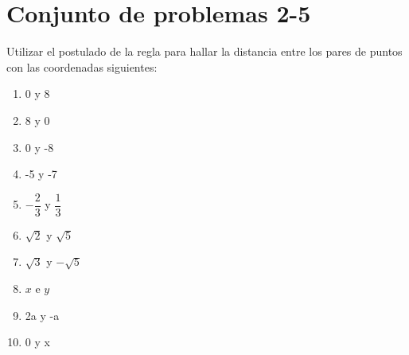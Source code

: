 \section{Conjunto de problemas 2-5}
\begin{prob}
Utilizar el postulado de la regla para hallar la distancia entre los pares de puntos con las coordenadas siguientes:
\begin{enumerate}[\bfseries a)]
\item 0 y 8\\
\item 8 y 0\\
\item 0 y -8\\
\item -5 y -7\\
\item $- \dfrac{2}{3}$ y $\dfrac{1}{3}$\\
\item $\sqrt{2}$ y $\sqrt{5}$\\
\item $\sqrt{3}$ y $- \sqrt{5}$\\
\item $x$ e $y$\\
\item 2a y -a\\
\item 0 y x\\
\end{enumerate}
\end{prob}